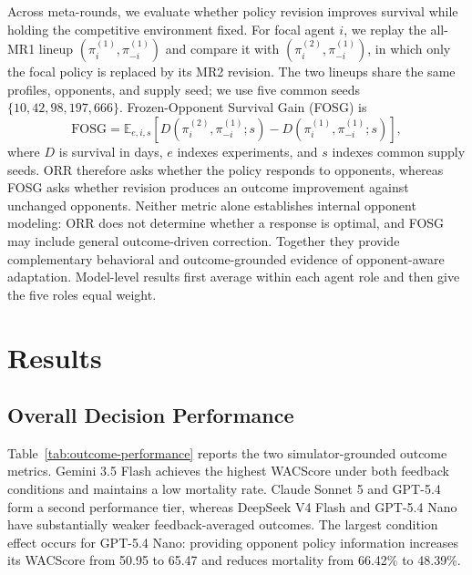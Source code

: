 \documentclass[letterpaper]{article} %
\begin{document}
Across meta-rounds, we evaluate whether policy revision improves
survival while holding the competitive environment fixed. For focal
agent $i$, we replay the all-MR1 lineup
$(\pi_i^{(1)},\pi_{-i}^{(1)})$ and compare it with
$(\pi_i^{(2)},\pi_{-i}^{(1)})$, in which only the focal policy is
replaced by its MR2 revision. The two lineups share the same profiles,
opponents, and supply seed; we use five common seeds
$\{10,42,98,197,666\}$. Frozen-Opponent Survival Gain (FOSG) is
\begin{equation}
    \mathrm{FOSG}
    =
    \mathbb{E}_{e,i,s}\!\left[
        D\!\left(\pi_i^{(2)},\pi_{-i}^{(1)};s\right)
        -D\!\left(\pi_i^{(1)},\pi_{-i}^{(1)};s\right)
    \right],
\end{equation}
where $D$ is survival in days, $e$ indexes experiments, and $s$
indexes common supply seeds. ORR therefore asks whether the policy
responds to opponents, whereas FOSG asks whether revision produces an
outcome improvement against unchanged opponents. Neither metric alone
establishes internal opponent modeling: ORR does not determine whether
a response is optimal, and FOSG may include general outcome-driven
correction. Together they provide complementary behavioral and
outcome-grounded evidence of opponent-aware adaptation. Model-level
results first average within each agent role and then give the five
roles equal weight.

\section{Results}

\subsection{Overall Decision Performance}

Table~\ref{tab:outcome-performance} reports the two simulator-grounded
outcome metrics. Gemini 3.5 Flash achieves the highest WACScore under
both feedback conditions and maintains a low mortality rate. Claude
Sonnet 5 and GPT-5.4 form a second performance tier, whereas DeepSeek
V4 Flash and GPT-5.4 Nano have substantially weaker feedback-averaged
outcomes. The largest condition effect occurs for GPT-5.4 Nano:
providing opponent policy information increases its WACScore from
50.95 to 65.47 and reduces mortality from 66.42\% to 48.39\%.
\end{document}
